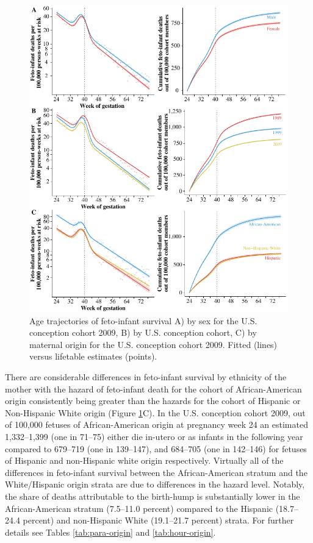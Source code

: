 \documentclass[10pt, twoside]{article}
\makeatletter
\def\cnstmaxfigwidth{
      \ifdim \Gin@nat@width>\linewidth
        \linewidth
      \else \Gin@nat@width
      \fi
    }
\let\Oldincludegraphics\includegraphics
\renewcommand{\includegraphics}[1]{\Oldincludegraphics[width=\cnstmaxfigwidth]{#1}}
\makeatother
\begin{document}
\clearpage

\begin{figure}
\centering
\includegraphics{fig/perinatal_hazards.pdf}
\caption{\label{fig:perinatal-hazards}Age trajectories of feto-infant survival A) by sex for the U.S. conception cohort 2009, B) by U.S. conception cohort, C) by maternal origin for the U.S. conception cohort 2009. Fitted (lines) versus lifetable estimates (points).}
\end{figure}

\clearpage

There are considerable differences in feto-infant survival by ethnicity of the mother with the hazard of feto-infant death for the cohort of African-American origin consistently being greater than the hazards for the cohort of Hispanic or Non-Hispanic White origin (Figure \ref{fig:perinatal-hazards}C). In the U.S. conception cohort 2009, out of 100,000 fetuses of African-American origin at pregnancy week 24 an estimated 1,332--1,399 (one in 71--75) either die in-utero or as infants in the following year compared to 679--719 (one in 139--147), and 684--705 (one in 142--146) for fetuses of Hispanic and non-Hispanic white origin respectively. Virtually all of the differences in feto-infant survival between the African-American stratum and the White/Hispanic origin strata are due to differences in the hazard level. Notably, the share of deaths attributable to the birth-hump is substantially lower in the African-American stratum (7.5--11.0 percent) compared to the Hispanic (18.7--24.4 percent) and non-Hispanic White (19.1--21.7 percent) strata. For further details see Tables \ref{tab:para-origin} and \ref{tab:hour-origin}.
\end{document}
